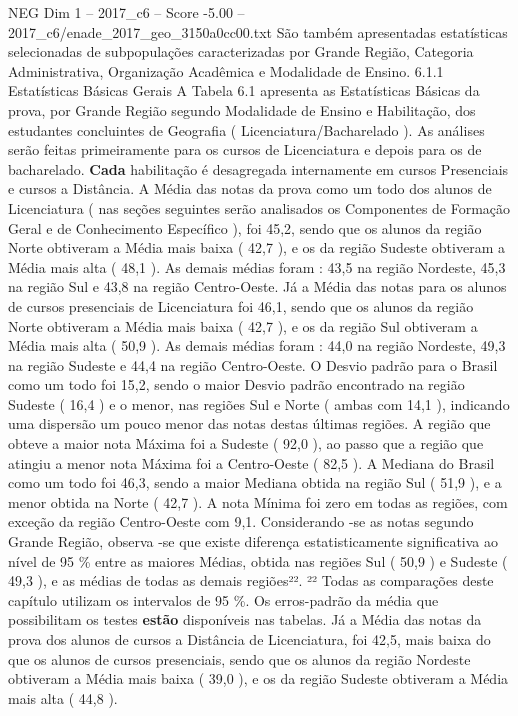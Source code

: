 \begin{textsample}{NEG Dim 1 – 2017\_c6 – Score -5.00 – 2017\_c6/enade\_2017\_geo\_3150a0cc00.txt}
São também apresentadas estatísticas selecionadas de subpopulações caracterizadas por Grande Região, Categoria Administrativa, Organização Acadêmica e Modalidade de Ensino. 6.1.1 Estatísticas Básicas Gerais A Tabela 6.1 apresenta as Estatísticas Básicas da prova, por Grande Região segundo Modalidade de Ensino e Habilitação, dos estudantes concluintes de Geografia ( Licenciatura/Bacharelado ).
As análises serão feitas primeiramente para os cursos de Licenciatura e depois para os de bacharelado. \textbf{Cada} habilitação é desagregada internamente em cursos Presenciais e cursos a Distância.
A Média das notas da prova como um todo dos alunos de Licenciatura ( nas seções seguintes serão analisados os Componentes de Formação Geral e de Conhecimento Específico ), foi 45,2, sendo que os alunos da região Norte obtiveram a Média mais baixa ( 42,7 ), e os da região Sudeste obtiveram a Média mais alta ( 48,1 ).
As demais médias foram : 43,5 na região Nordeste, 45,3 na região Sul e 43,8 na região Centro-Oeste.
Já a Média das notas para os alunos de cursos presenciais de Licenciatura foi 46,1, sendo que os alunos da região Norte obtiveram a Média mais baixa ( 42,7 ), e os da região Sul obtiveram a Média mais alta ( 50,9 ).
As demais médias foram : 44,0 na região Nordeste, 49,3 na região Sudeste e 44,4 na região Centro-Oeste.
O Desvio padrão para o Brasil como um todo foi 15,2, sendo o maior Desvio padrão encontrado na região Sudeste ( 16,4 ) e o menor, nas regiões Sul e Norte ( ambas com 14,1 ), indicando uma dispersão um pouco menor das notas destas últimas regiões.
A região que obteve a maior nota Máxima foi a Sudeste ( 92,0 ), ao passo que a região que atingiu a menor nota Máxima foi a Centro-Oeste ( 82,5 ).
A Mediana do Brasil como um todo foi 46,3, sendo a maior Mediana obtida na região Sul ( 51,9 ), e a menor obtida na Norte ( 42,7 ).
A nota Mínima foi zero em todas as regiões, com exceção da região Centro-Oeste com 9,1.
Considerando -se as notas segundo Grande Região, observa -se que existe diferença estatisticamente significativa ao nível de 95 \% entre as maiores Médias, obtida nas regiões Sul ( 50,9 ) e Sudeste ( 49,3 ), e as médias de todas as demais regiões²². ²² Todas as comparações deste capítulo utilizam os intervalos de 95 \%.
Os erros-padrão da média que possibilitam os testes \textbf{estão} disponíveis nas tabelas.
Já a Média das notas da prova dos alunos de cursos a Distância de Licenciatura, foi 42,5, mais baixa do que os alunos de cursos presenciais, sendo que os alunos da região Nordeste obtiveram a Média mais baixa ( 39,0 ), e os da região Sudeste obtiveram a Média mais alta ( 44,8 ).

\end{textsample}
